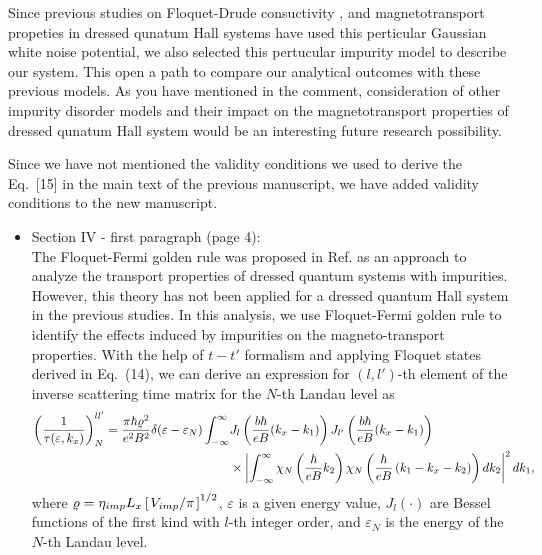 \documentclass{article}
\begin{document}
Since previous studies on Floquet-Drude consuctivity \cite{wackerl20}, and magnetotransport propeties in dressed qunatum Hall systems \cite{dini16} have  used this perticular Gaussian white noise potential, we also selected this pertucular impurity model to describe our system. This open a path to compare our analytical outcomes with these previous models. As you have mentioned in the comment, consideration of other impurity disorder models and their impact on the magnetotransport properties of dressed qunatum Hall system would be an interesting future research possibility.

Since we have not mentioned the validity conditions we used to derive the Eq.~[15] in the main text of the previous manuscript, we have added validity conditions to the new manuscript.

\begin{itemize}
  \item Section IV - first paragraph (page 4):\\
  {\color{Maroon}
  The Floquet-Fermi golden rule was proposed in Ref. \cite{wackerl20} as an approach to analyze the transport properties of dressed quantum systems with impurities.
  However, this theory has not been applied for a dressed quantum Hall system in the previous studies. In this analysis, we use Floquet-Fermi golden rule to identify the effects induced by impurities on the magneto-transport properties.
  With the help of $t-t'$ formalism \cite{wackerl20,grifoni98,sambe75,peskin93,althorpe97} and applying Floquet states derived in Eq.~(14), we can derive an  expression for $(l,l')$-th element of the inverse scattering time matrix for the $N$-th Landau level as
  \begin{equation} \label{eq:15}
    \begin{aligned}
      \left(\frac{1}{\tau(\varepsilon,k_x)}\right)^{ll'}_N =
      \frac{ \pi \hbar\varrho^2}{e^2B^2} \delta(\varepsilon - \varepsilon_N)
      \int_{-\infty}^{\infty} &
      J_l \bm{\left(} \frac{b\hbar}{eB}({k}_x - k_1) \bm{\right)}
      J_{l'} \bm{\left(} \frac{b\hbar}{eB}({k}_x - k_1) \bm{\right)}
      \\
      & \times
      \left|
      \int_{-\infty}^{\infty}
      \chi_N \left( \frac{\hbar}{eB}k_2 \right)
      \chi_N \bm{\left(} \frac{\hbar}{eB}
      \left( k_1 - {k}_x - k_2 \right) \bm{\right)}
      dk_2 \right|^2 d k_1,
    \end{aligned}
  \end{equation}
  where $\varrho = \eta_{imp} L_x \left[\flatfrac{ V_{imp}}{\pi}\right]^{1/2}$, $\varepsilon$ is a given energy value, $J_l(\cdot)$ are Bessel functions of the first kind with $l$-th integer order, and $\varepsilon_N$ is the energy of the $N$-th Landau level.
}
\end{itemize}
\end{document}
